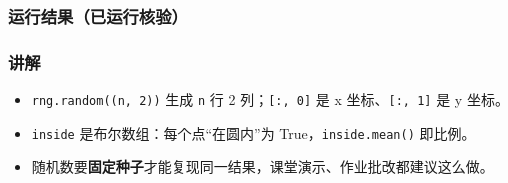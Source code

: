 \begin{Shaded}
\begin{Highlighting}[]

\OperatorTok{=}\NormalTok{)   }
\OperatorTok{=} 
\OperatorTok{=}\NormalTok{))          }\CommentTok{\# n 个 (x, y)，x,y in [0,1)}

\OperatorTok{=}\NormalTok{ (pts[:, }\NormalTok{] }\OperatorTok{**}  \OperatorTok{+}\NormalTok{ pts[:, }\NormalTok{] }\OperatorTok{**} \NormalTok{) }\OperatorTok{\textless{}=}    
\OperatorTok{=}  \OperatorTok{*}

\NormalTok{(}
\NormalTok{(}
\NormalTok{(}
\end{Highlighting}
\end{Shaded}

\subsubsection{运行结果（已运行核验）}\label{ux8fd0ux884cux7ed3ux679cux5df2ux8fd0ux884cux6838ux9a8c-2}

\begin{Shaded}
\begin{Highlighting}[]
\end{Highlighting}
\end{Shaded}

\subsubsection{讲解}\label{ux8bb2ux89e3-2}

\begin{itemize}
\tightlist
\item
  \texttt{rng.random((n,\ 2))} 生成 \texttt{n} 行 2
  列；\texttt{{[}:,\ 0{]}} 是 x 坐标、\texttt{{[}:,\ 1{]}} 是 y 坐标。
\item
  \texttt{inside} 是布尔数组：每个点``在圆内''为
  True，\texttt{inside.mean()} 即比例。
\item
  随机数要\textbf{固定种子}才能复现同一结果，课堂演示、作业批改都建议这么做。
\end{itemize}

